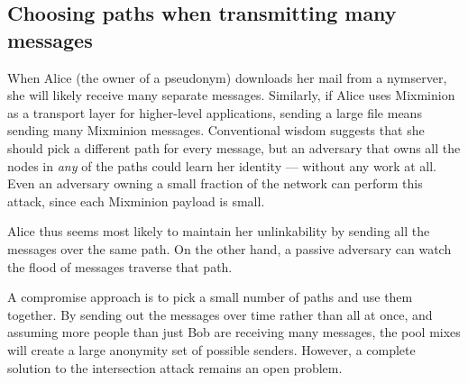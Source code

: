 \documentclass[final,inpress,inline]{ieee}
\begin{document}
\subsection{Choosing paths when transmitting many messages}
\label{subsec:many-messages}

When Alice (the owner of a pseudonym) downloads her mail from a
nymserver, she will likely receive many separate messages. Similarly, if
Alice uses Mixminion as a transport layer for higher-level applications,
sending a large file means sending many Mixminion messages.
Conventional wisdom suggests that she should pick a different
path for every message, but an adversary that owns all the nodes in
\emph{any} of the paths could learn her identity --- without any work
at all. Even an adversary owning a small fraction of the network
can perform this attack, since each Mixminion payload is small.


Alice thus seems most likely to maintain her unlinkability by sending all
the messages over the same path. On the other hand, a passive adversary
can watch the flood of messages traverse that path.

A compromise approach is to pick a small number of paths and use them
together. By sending out the messages over time rather than all at once,
and assuming more people than just Bob are receiving many messages,
the pool mixes will create a large anonymity set of possible senders.
However, a complete solution to the intersection attack remains an
open problem.


\end{document}
